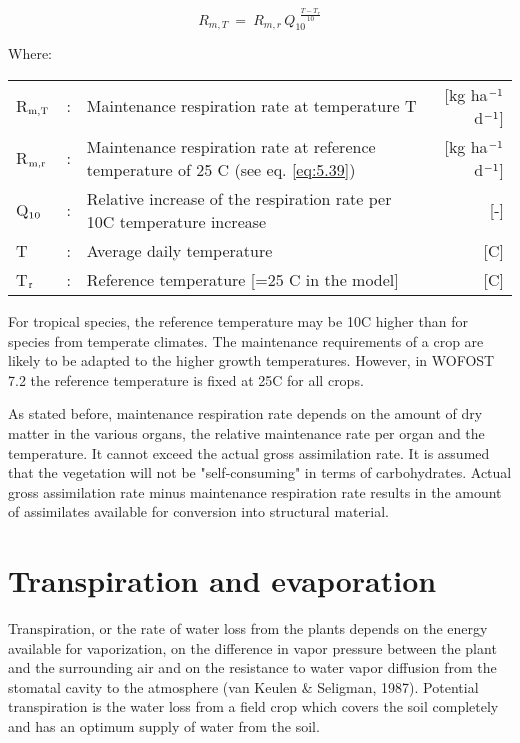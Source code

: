 \begin{equation}
\label{eq:5.40}
R _{m,T} ~=~ R _{m,r} \, Q _{10}^{~~{\frac{T-T _{r} }{10}} }
\end{equation}

Where:\\[5pt]
\begin{tabularx}{\textwidth}{llXr}
	R$_{{\rm m,T}}$ &:& Maintenance respiration rate at 
	temperature T &    [kg ha$^{{\rm -1}}$ d$^{{\rm -1}}$]\\
	R$_{{\rm m,r}}$ &:& Maintenance respiration rate at reference 
	temperature of 25 \textdegree C (see eq. \ref{eq:5.39})   &     [kg ha$^{{\rm -1}}$ d$^{{\rm -1}}$]\\
	Q$_{{\rm 10}}$ &:& Relative increase of the respiration rate
	per 10\textdegree C temperature increase    &    [-]\\
	T &:& Average daily temperature    &     [\textdegree C]\\
	T$_{{\rm r}}$ &:& Reference temperature {\small [=25 \textdegree C in 
		the model]}    &    [\textdegree C]\\
\end{tabularx}


For tropical species, the reference temperature may be 10\textdegree C higher than for species from
temperate climates. The maintenance requirements of a crop are likely to be adapted to
the higher growth temperatures. However, in WOFOST 7.2 the reference temperature is
fixed at 25\textdegree C for all crops.

As stated before, maintenance respiration rate depends on the amount of dry matter in the
various organs, the relative maintenance rate per organ and the temperature. It cannot
exceed the actual gross assimilation rate. It is assumed that the vegetation will not be
"self-consuming" in terms of carbohydrates. Actual gross assimilation rate minus 
maintenance respiration rate results in the amount of assimilates available for conversion into
structural material.

\section{Transpiration and evaporation}
\label{sec:evapotranspiration}

Transpiration, or the rate of water loss from the plants depends on the energy available
for vaporization, on the difference in vapor pressure between the plant and the surrounding 
air and on the resistance to water vapor diffusion from the stomatal cavity to the
atmosphere (van Keulen \& Seligman, 1987). Potential transpiration is the water loss from
a field crop which covers the soil completely and has an optimum supply of water from
the soil. 

